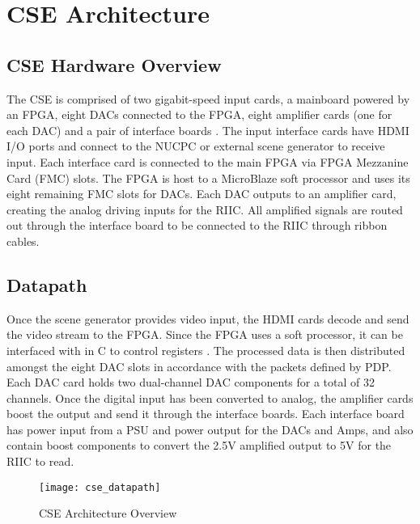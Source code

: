 %
%
\chapter{CSE Architecture}
\section{CSE Hardware Overview}
The CSE is comprised of two gigabit-speed input cards, a mainboard powered by an FPGA, eight DACs connected to the FPGA, eight amplifier cards (one for each DAC) and a pair of interface boards \cite{chris}. The input interface cards have HDMI I/O ports and connect to the NUCPC or external scene generator to receive input. Each interface card is connected to the main FPGA via FPGA Mezzanine Card (FMC) slots. The FPGA is host to a MicroBlaze soft processor and uses its eight remaining FMC slots for DACs. Each DAC outputs to an amplifier card, creating the analog driving inputs for the RIIC. All amplified signals are routed out through the interface board to be connected to the RIIC through ribbon cables.
\section{Datapath}
Once the scene generator provides video input, the HDMI cards decode and send the video stream to the FPGA. Since the FPGA uses a soft processor, it can be interfaced with in C to control registers \cite{chris}. The processed data is then distributed amongst the eight DAC slots in accordance with the packets defined by PDP. Each DAC card holds two dual-channel DAC components for a total of 32 channels. Once the digital input has been converted to analog, the amplifier cards boost the output and send it through the interface boards. Each interface board has power input from a PSU and power output for the DACs and Amps, and also contain boost components to convert the 2.5V amplified output to 5V for the RIIC to read. \par
\begin{figure}[!htb]
	\texttt{[image: cse\_datapath]}
	\centering
	\caption{CSE Architecture Overview}
	\centering
\end{figure}
